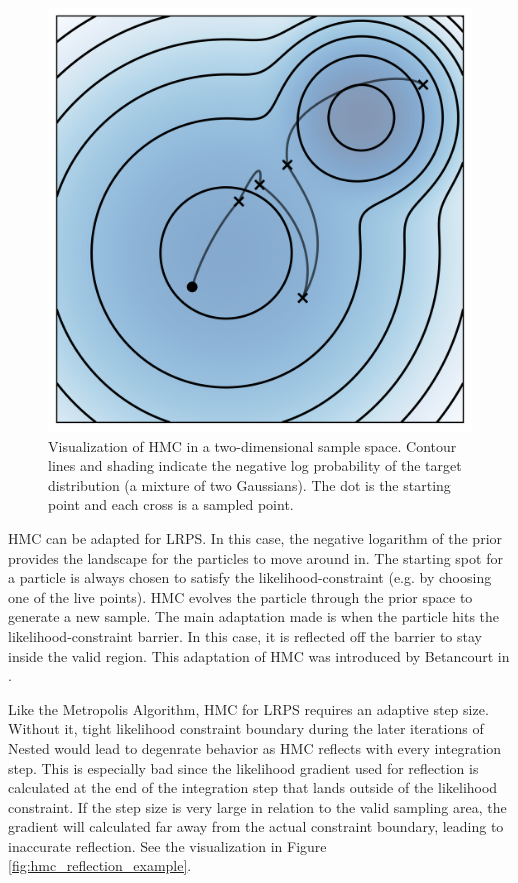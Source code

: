 \documentclass[12pt, a4paper]{report}
\begin{document}
\begin{figure}
    \centering
    \includegraphics[scale=0.8]{figs/hmc_example.png}
    \caption{Visualization of HMC in a two-dimensional sample space. Contour lines and shading indicate the negative log probability of the target distribution (a mixture of two Gaussians). The dot is the starting point and each cross is a sampled point.}
    \label{fig:hmc_example}
\end{figure}

HMC can be adapted for LRPS.
In this case, the negative logarithm of the prior provides the landscape for the particles to move around in.
The starting spot for a particle is always chosen to satisfy the likelihood-constraint (e.g. by choosing one of the live points).
HMC evolves the particle through the prior space to generate a new sample.
The main adaptation made is when the particle hits the likelihood-constraint barrier.
In this case, it is reflected off the barrier to stay inside the valid region.
This adaptation of HMC was introduced by Betancourt in \cite{hmc_in_ns}.

Like the Metropolis Algorithm, HMC for LRPS requires an adaptive step size.
Without it, tight likelihood constraint boundary during the later iterations of Nested would lead to degenrate behavior as HMC reflects with every integration step.
This is especially bad since the likelihood gradient used for reflection is calculated at the end of the integration step that lands outside of the likelihood constraint.
If the step size is very large in relation to the valid sampling area, the gradient will calculated far away from the actual constraint boundary, leading to inaccurate reflection.
See the visualization in Figure \ref{fig:hmc_reflection_example}.
\end{document}

